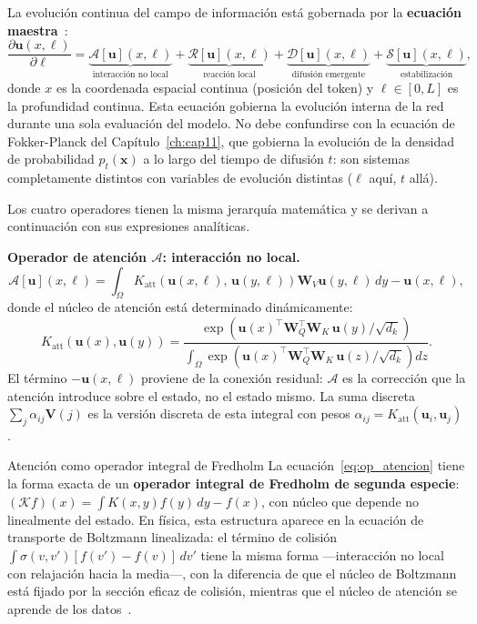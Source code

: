 La evolución continua del campo de información está gobernada por
la \textbf{ecuación maestra}~\cite{transformer_pde_2024}:
\begin{equation}
  \frac{\partial \bm{u}(x,\ell)}{\partial \ell}
  = \underbrace{\mathcal{A}[\bm{u}](x,\ell)}_{\text{interacción no local}}
  + \underbrace{\mathcal{R}[\bm{u}](x,\ell)}_{\text{reacción local}}
  + \underbrace{\mathcal{D}[\bm{u}](x,\ell)}_{\text{difusión emergente}}
  + \underbrace{\mathcal{S}[\bm{u}](x,\ell)}_{\text{estabilización}},
  \label{eq:master_pde}
\end{equation}
donde $x$ es la coordenada espacial continua (posición del token) y
$\ell \in [0,L]$ es la profundidad continua. Esta ecuación gobierna
la evolución interna de la red durante una sola evaluación del
modelo. No debe confundirse con la ecuación de Fokker-Planck del
Capítulo~\ref{ch:cap11}, que gobierna la evolución de la densidad
de probabilidad $p_t(\bm{x})$ a lo largo del tiempo de difusión
$t$: son sistemas completamente distintos con variables de evolución
distintas ($\ell$ aquí, $t$ allá).

Los cuatro operadores tienen la misma jerarquía matemática y se
derivan a continuación con sus expresiones analíticas.

\medskip
\noindent\textbf{Operador de atención $\mathcal{A}$: interacción
no local.}
\begin{equation}
  \mathcal{A}[\bm{u}](x,\ell)
  = \int_\Omega K_{\mathrm{att}}\!\left(\bm{u}(x,\ell),\,
    \bm{u}(y,\ell)\right)
    \bm{W}_V\bm{u}(y,\ell)\,dy
  - \bm{u}(x,\ell),
  \label{eq:op_atencion}
\end{equation}
donde el núcleo de atención está determinado dinámicamente:
\[
  K_{\mathrm{att}}(\bm{u}(x),\bm{u}(y))
  = \frac{\exp\!\left(\bm{u}(x)^\top\bm{W}_Q^\top
    \bm{W}_K\,\bm{u}(y)/\sqrt{d_k}\right)}
  {\displaystyle\int_\Omega
    \exp\!\left(\bm{u}(x)^\top\bm{W}_Q^\top
    \bm{W}_K\,\bm{u}(z)/\sqrt{d_k}\right)dz}.
\]
El término $-\bm{u}(x,\ell)$ proviene de la conexión residual:
$\mathcal{A}$ es la corrección que la atención introduce sobre el
estado, no el estado mismo. La suma discreta $\sum_j \alpha_{ij}
\bm{V}(j)$ es la versión discreta de esta integral con pesos
$\alpha_{ij} = K_{\mathrm{att}}(\bm{u}_i, \bm{u}_j)$.

\begin{fisicaconexion}{Atención como operador integral de Fredholm}
La ecuación~\eqref{eq:op_atencion} tiene la forma exacta de un
\textbf{operador integral de Fredholm de segunda especie}:
$(\mathcal{K}f)(x) = \int K(x,y)f(y)\,dy - f(x)$,
con núcleo que depende no linealmente del estado. En física, esta
estructura aparece en la ecuación de transporte de Boltzmann
linealizada: el término de colisión
$\int \sigma(v,v')[f(v') - f(v)]\,dv'$ tiene la misma forma
—interacción no local con relajación hacia la media—,
con la diferencia de que el núcleo de Boltzmann está fijado por
la sección eficaz de colisión, mientras que el núcleo de atención
se aprende de los datos~\cite{villani2002review}.
\end{fisicaconexion}


